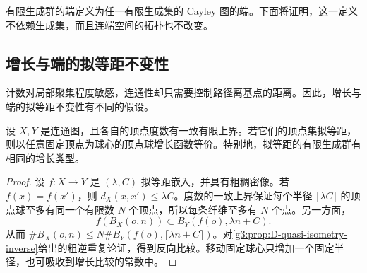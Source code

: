 有限生成群的端定义为任一有限生成集的 Cayley 图的端。下面将证明，这一定义不依赖生成集，而且连端空间的拓扑也不改变。

\subsection{增长与端的拟等距不变性}
\label{g3:subsec:D02:04}

计数对局部聚集程度敏感，连通性却只需要控制路径离基点的距离。因此，增长与端的拟等距不变性有不同的假设。

\begin{theorem}\label{g3:thm:D-growth-quasi-isometry}
	设 \(X,Y\) 是连通图，且各自的顶点度数有一致有限上界。若它们的顶点集拟等距，则以任意固定顶点为球心的顶点球增长函数等价。特别地，拟等距的有限生成群有相同的增长类型。
\end{theorem}
\begin{proof}
	设 \(f:X\rightarrow Y\) 是 \((\lambda,C)\) 拟等距嵌入，并具有粗稠密像。若 \(f(x)=f(x')\)，则 \(d_X(x,x')\le\lambda C\)。度数的一致上界保证每个半径 \(\lceil\lambda C\rceil\) 的顶点球至多有同一个有限数 \(N\) 个顶点，所以每条纤维至多有 \(N\) 个点。另一方面，
	\[
		f(B_X(o,n))\subset B_Y(f(o),\lambda n+C).
	\]
	从而 \(\#B_X(o,n)\le N\#B_Y(f(o),\lceil\lambda n+C\rceil)\)。对\cref{g3:prop:D-quasi-isometry-inverse}给出的粗逆重复论证，得到反向比较。移动固定球心只增加一个固定半径，也可吸收到增长比较的常数中。
\end{proof}

